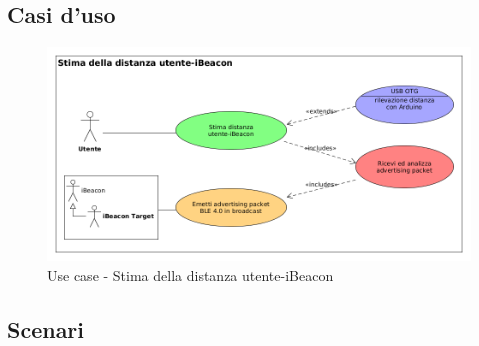 \subsection{Casi d'uso}
\begin{figure}[ph]
	\centering
	\includegraphics[scale=.45]{img/uml/use_case/use_case1}
	\caption[Use case - Stima della distanza utente-iBeacon]{Use case - Stima della distanza utente-iBeacon}
	\label{fig:usecase}
\end{figure}

\subsection{Scenari}